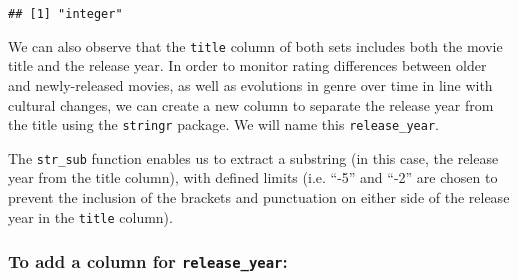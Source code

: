 \documentclass[]{article}
\newenvironment{Shaded}{\begin{snugshade}}{\end{snugshade}}
\newcommand{\DataTypeTok}[1]{\textcolor[rgb]{0.13,0.29,0.53}{#1}}
\newcommand{\KeywordTok}[1]{\textcolor[rgb]{0.13,0.29,0.53}{\textbf{#1}}}
\newcommand{\NormalTok}[1]{#1}
\newcommand{\OperatorTok}[1]{\textcolor[rgb]{0.81,0.36,0.00}{\textbf{#1}}}
\newcommand{\StringTok}[1]{\textcolor[rgb]{0.31,0.60,0.02}{#1}}
\begin{document}
\begin{verbatim}
## [1] "integer"
\end{verbatim}

\begin{Shaded}
\end{Shaded}

We can also observe that the \texttt{title} column of both sets includes
both the movie title and the release year. In order to monitor rating
differences between older and newly-released movies, as well as
evolutions in genre over time in line with cultural changes, we can
create a new column to separate the release year from the title using
the \texttt{stringr} package. We will name this \texttt{release\_year}.

The \texttt{str\_sub} function enables us to extract a substring (in
this case, the release year from the title column), with defined limits
(i.e. ``-5'' and ``-2'' are chosen to prevent the inclusion of the
brackets and punctuation on either side of the release year in the
\texttt{title} column).

\hypertarget{to-add-a-column-for-release_year}{%
\subsubsection{\texorpdfstring{To add a column for
\texttt{release\_year}:}{To add a column for release\_year:}}\label{to-add-a-column-for-release_year}}
\end{document}
